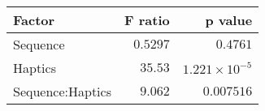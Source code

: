 \begin{tabular}{lrr}
\toprule
           Factor &  F ratio &               p value \\
\midrule
         Sequence & $0.5297$ &              $0.4761$ \\
          Haptics &  $35.53$ & $1.221\times 10^{-5}$ \\
 Sequence:Haptics &  $9.062$ &            $0.007516$ \\
\bottomrule
\end{tabular}
